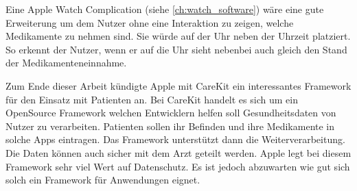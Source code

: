 Eine Apple Watch Complication (siehe \ref{ch:watch_software}) wäre eine gute Erweiterung um dem Nutzer ohne eine Interaktion zu zeigen, welche Medikamente zu nehmen sind. Sie würde auf der Uhr neben der Uhrzeit platziert. So erkennt der Nutzer, wenn er auf die Uhr sieht nebenbei auch gleich den Stand der Medikamenteneinnahme.

Zum Ende dieser Arbeit kündigte Apple mit CareKit \cite{Apple:2016:careKit} ein interessantes Framework für den Einsatz mit Patienten an. Bei CareKit handelt es sich um ein OpenSource Framework welchen Entwicklern helfen soll Gesundheitsdaten von Nutzer zu verarbeiten. Patienten sollen ihr Befinden und ihre Medikamente in solche Apps eintragen. Das Framework unterstützt dann die Weiterverarbeitung. Die Daten können auch sicher mit dem Arzt geteilt werden. Apple legt bei diesem Framework sehr viel Wert auf Datenschutz. Es ist jedoch abzuwarten wie gut sich solch ein Framework für Anwendungen eignet.

